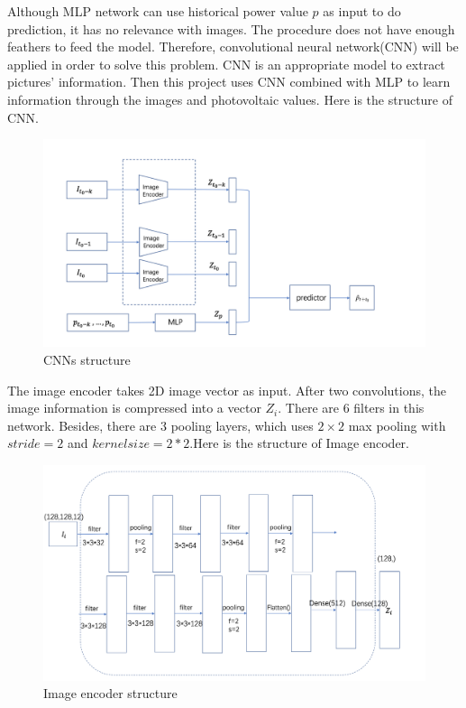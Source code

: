 Although MLP network can use historical power value $p$ as input to do prediction, it has no relevance with images. The procedure does not have enough feathers to feed the model. Therefore, convolutional neural network(CNN) will be applied in order to solve this problem.  CNN is an appropriate model to extract pictures' information. Then this project uses CNN combined with MLP to learn information through the images and  photovoltaic values. Here is the structure of CNN.\\[2ex]


\begin{figure}[!ht]
	\centering
	\includegraphics[width=1.0\textwidth]{cnn_mlp.png}
	\caption{CNNs structure\label{fig:cnn_mlp}}
\end{figure}

The image encoder takes 2D image vector as input. After two convolutions, the image information is compressed into a vector $Z_{i}$. There are 6 filters in this network. Besides, there are 3 pooling layers, which uses $2\times2$ max pooling with $stride = 2$ and $kernel size = 2 * 2$.Here is the structure of Image encoder.

\begin{figure}[!ht]
	\centering
	\includegraphics[width=1.0\textwidth]{predictor.png}
	\caption{Image encoder structure\label{fig:Image encoder}}
\end{figure}



